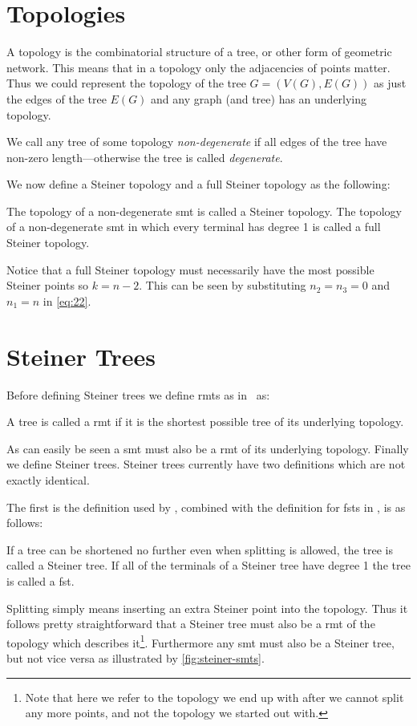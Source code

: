 \section{Topologies}
\label{sec:topologies-1}

A topology is the combinatorial structure of a tree, or other form of geometric
network. This means that in a topology only the adjacencies of points
matter. Thus we could represent the topology of the tree $G = (V(G), E(G))$ as
just the edges of the tree $E(G)$ and any graph (and tree) has an
underlying topology.

We call any tree of some topology \textit{non-degenerate} if all edges of the tree have
non-zero length---otherwise the tree is called \textit{degenerate}.

We now define a Steiner topology and a full Steiner topology as the following:
%
\begin{definition}
  The topology of a non-degenerate \ac{smt} is called a Steiner topology. The
  topology of a non-degenerate \ac{smt} in which every terminal has degree 1 is
  called a full Steiner topology.
\end{definition}
%
Notice that a full Steiner topology must necessarily have the most possible
Steiner points so $ k = n - 2$. This can be seen by substituting $n_2 = n_3 = 0$
and $n_1 = n$ in \cref{eq:22}.

\section{Steiner Trees}
\label{sec:steiner-trees}

Before defining Steiner trees we define \acp{rmt} as in~\cite{gilbert1968}
as:
%
\begin{definition}
  A tree is called a \acl{rmt} if it is the shortest possible tree of its
  underlying topology.
\end{definition}
%
As can easily be seen a \ac{smt} must also be a \ac{rmt} of its underlying
topology. Finally we define Steiner trees. Steiner trees currently have two
definitions which are not exactly identical.

The first is the definition used by \textcite{gilbert1968}, combined with the
definition for \acp{fst} in \textcite{smith1992}, is as follows:
%
\begin{definition}
  If a tree can be shortened no further even when splitting is allowed, the tree
  is called a Steiner tree. If all of the terminals of a Steiner tree have
  degree 1 the tree is called a \acl{fst}.\label{def:steiner-tree}
\end{definition}
%
Splitting simply means inserting an extra Steiner point into the topology. Thus
it follows pretty straightforward that a Steiner tree must also be a \ac{rmt} of
the topology which describes it\footnote{Note that here we refer to the topology
  we end up with after we cannot split any more points, and not the topology we
  started out with.}. Furthermore any \ac{smt} must also be a Steiner tree, but
not vice versa as illustrated by \cref{fig:steiner-smts}.


